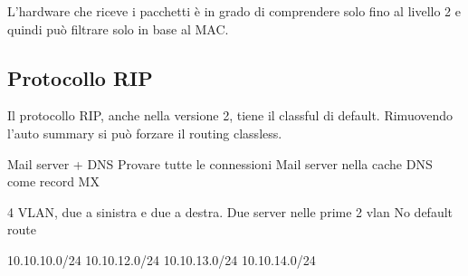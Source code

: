 \documentclass{article}
\begin{document}
    L'hardware che riceve i pacchetti è in grado di comprendere solo fino al livello 2 e quindi può filtrare solo in base al MAC.

    \subsection{Protocollo RIP}
    Il protocollo RIP, anche nella versione 2, tiene il classful di default.
    Rimuovendo l'auto summary si può forzare il routing classless.

    Mail server + DNS
    Provare tutte le connessioni
    Mail server nella cache DNS come record MX

    4 VLAN, due a sinistra e due a destra.
    Due server nelle prime 2 vlan
    No default route

    10.10.10.0/24
    10.10.12.0/24
    10.10.13.0/24
    10.10.14.0/24
\end{document}
